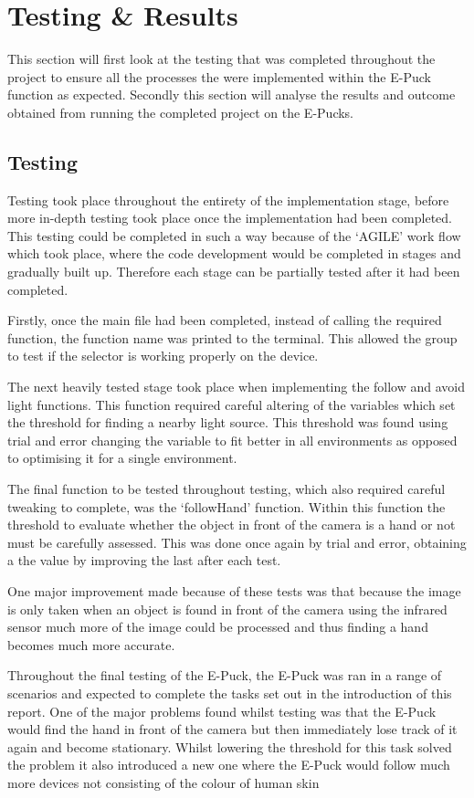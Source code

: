 \section{Testing \& Results}
\label{sec:ResultsTesting}
This section will first look at the testing that was completed throughout the project to ensure all the processes the were implemented within the E-Puck function as expected. Secondly this section will analyse the results and outcome obtained from running the completed project on the E-Pucks.

\subsection{Testing}
Testing took place throughout the entirety of the implementation stage, before more in-depth testing took place once the implementation had been completed. This testing could be completed in such a way because of the `AGILE' work flow which took place, where the code development would be completed in stages and gradually built up. Therefore each stage can be partially tested after it had been completed.

Firstly, once the main file had been completed, instead of calling the required function, the function name was printed to the terminal. This allowed the group to test if the selector is working properly on the device.

The next heavily tested stage took place when implementing the follow and avoid light functions. This function required careful altering of the variables which set the threshold for finding a nearby light source. This threshold was found using trial and error changing the variable to fit better in all environments as opposed to optimising it for a single environment.

The final function to be tested throughout testing, which also required careful tweaking to complete, was the `followHand' function. Within this function the threshold to evaluate whether the object in front of the camera is a hand or not must be carefully assessed. This was done once again by trial and error, obtaining a the value by improving the last after each test.

One major improvement made because of these tests was that because the image is only taken when an object is found in front of the camera using the infrared sensor much more of the image could be processed and thus finding a hand becomes much more accurate. 

Throughout the final testing of the E-Puck, the E-Puck was ran in a range of scenarios and expected to complete the tasks set out in the introduction of this report. One of the major problems found whilst testing was that the E-Puck would find the hand in front of the camera but then immediately lose track of it again and become stationary. Whilst lowering the threshold for this task solved the problem it also introduced a new one where the E-Puck would follow much more devices not consisting of the colour of human skin

